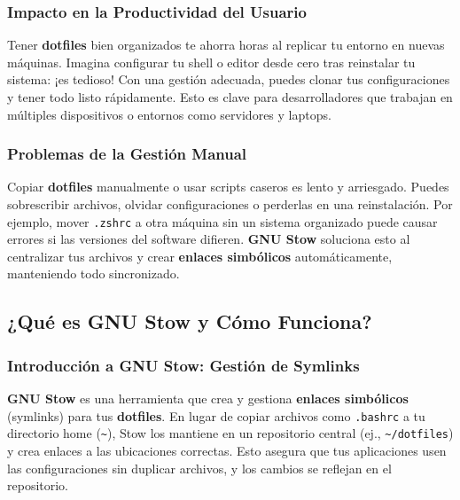 \documentclass[
  jou,
  floatsintext,
  longtable,
  a4paper,
  nolmodern,
  notxfonts,
  notimes,
  colorlinks=true,linkcolor=blue,citecolor=blue,urlcolor=blue]{apa7}
\begin{document}
\subsubsection{Impacto en la Productividad del
Usuario}\label{impacto-en-la-productividad-del-usuario}

Tener \textbf{dotfiles} bien organizados te ahorra horas al replicar tu
entorno en nuevas máquinas. Imagina configurar tu shell o editor desde
cero tras reinstalar tu sistema: ¡es tedioso! Con una gestión adecuada,
puedes clonar tus configuraciones y tener todo listo rápidamente. Esto
es clave para desarrolladores que trabajan en múltiples dispositivos o
entornos como servidores y laptops.

\subsubsection{Problemas de la Gestión
Manual}\label{problemas-de-la-gestiuxf3n-manual}

Copiar \textbf{dotfiles} manualmente o usar scripts caseros es lento y
arriesgado. Puedes sobrescribir archivos, olvidar configuraciones o
perderlas en una reinstalación. Por ejemplo, mover \texttt{.zshrc} a
otra máquina sin un sistema organizado puede causar errores si las
versiones del software difieren. \textbf{GNU Stow} soluciona esto al
centralizar tus archivos y crear \textbf{enlaces simbólicos}
automáticamente, manteniendo todo sincronizado.

\subsection{¿Qué es GNU Stow y Cómo
Funciona?}\label{quuxe9-es-gnu-stow-y-cuxf3mo-funciona}

\subsubsection{Introducción a GNU Stow: Gestión de
Symlinks}\label{introducciuxf3n-a-gnu-stow-gestiuxf3n-de-symlinks}

\textbf{GNU Stow} es una herramienta que crea y gestiona \textbf{enlaces
simbólicos} (symlinks) para tus \textbf{dotfiles}. En lugar de copiar
archivos como \texttt{.bashrc} a tu directorio home
(\texttt{\textasciitilde{}}), Stow los mantiene en un repositorio
central (ej., \texttt{\textasciitilde{}/dotfiles}) y crea enlaces a las
ubicaciones correctas. Esto asegura que tus aplicaciones usen las
configuraciones sin duplicar archivos, y los cambios se reflejan en el
repositorio.
\end{document}
